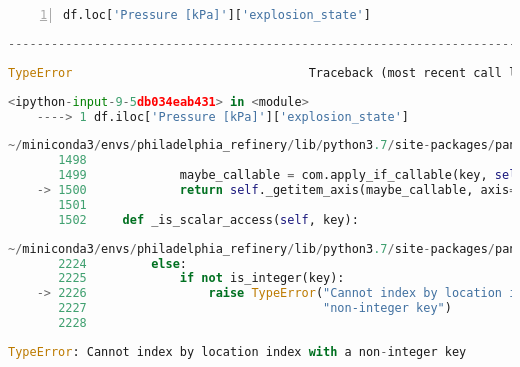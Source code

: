 \documentclass[10pt,parskip=half,
toc=sectionentrywithdots,
bibliography=totocnumbered,
captions=tableheading,numbers=noendperiod]{scrartcl}
\begin{document}
\begin{lstlisting}[language=Python,numbers=left,xleftmargin=20pt,xrightmargin=5pt,belowskip=5pt,aboveskip=5pt]
df.loc['Pressure [kPa]']['explosion_state']
\end{lstlisting}

\begin{lstlisting}[language=Python,numbers=none,xrightmargin=5pt,belowskip=2pt,aboveskip=2pt]
    ---------------------------------------------------------------------------
\end{lstlisting}

\begin{lstlisting}[language=Python,numbers=none,xrightmargin=5pt,belowskip=2pt,aboveskip=2pt]
    TypeError                                 Traceback (most recent call last)
\end{lstlisting}

\begin{lstlisting}[language=Python,numbers=none,xrightmargin=5pt,belowskip=2pt,aboveskip=2pt]
    <ipython-input-9-5db034eab431> in <module>
    ----> 1 df.iloc['Pressure [kPa]']['explosion_state']

\end{lstlisting}

\begin{lstlisting}[language=Python,numbers=none,xrightmargin=5pt,belowskip=2pt,aboveskip=2pt]
    ~/miniconda3/envs/philadelphia_refinery/lib/python3.7/site-packages/pandas/core/indexing.py in __getitem__(self, key)
       1498
       1499             maybe_callable = com.apply_if_callable(key, self.obj)
    -> 1500             return self._getitem_axis(maybe_callable, axis=axis)
       1501
       1502     def _is_scalar_access(self, key):

\end{lstlisting}

\begin{lstlisting}[language=Python,numbers=none,xrightmargin=5pt,belowskip=2pt,aboveskip=2pt]
    ~/miniconda3/envs/philadelphia_refinery/lib/python3.7/site-packages/pandas/core/indexing.py in _getitem_axis(self, key, axis)
       2224         else:
       2225             if not is_integer(key):
    -> 2226                 raise TypeError("Cannot index by location index with a "
       2227                                 "non-integer key")
       2228

\end{lstlisting}

\begin{lstlisting}[language=Python,numbers=none,xrightmargin=5pt,belowskip=2pt,aboveskip=2pt]
    TypeError: Cannot index by location index with a non-integer key
\end{lstlisting}
\end{document}
